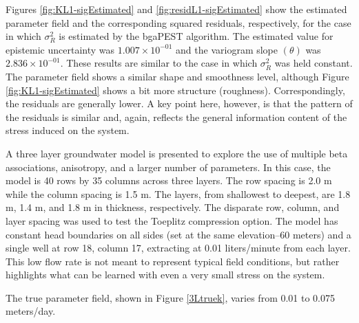 \documentclass[11pt,oneside,onecolumn]{usgsreport}
\begin{document}
\begin{appendix}
Figures \ref{fig:KL1-sigEstimated} and \ref{fig:residL1-sigEstimated}
show the estimated parameter field and the corresponding squared residuals,
respectively, for the case in which $\sigma_{R}^{2}$ is estimated
by the bgaPEST algorithm. The estimated value for epistemic uncertainty
was $1.007\times10^{-01}$ and the variogram slope $\left(\theta\right)$
was $2.836\times10^{-01}.$ These results are similar to the case
in which $\sigma_{R}^{2}$ was held constant. The parameter field
shows a similar shape and smoothness level, although Figure \ref{fig:KL1-sigEstimated}
shows a bit more structure (roughness). Correspondingly, the residuals
are generally lower. A key point here, however, is that the pattern
of the residuals is similar and, again, reflects the general information
content of the stress induced on the system.



A three layer groundwater model is presented to explore the use of
multiple beta associations, anisotropy, and a larger number of parameters.
In this case, the model is 40 rows by 35 columns across three layers.
The row spacing is 2.0 m while the column spacing is 1.5 m. The layers,
from shallowest to deepest, are 1.8 m, 1.4 m, and 1.8 m in thickness,
respectively. The disparate row, column, and layer spacing was used
to test the Toeplitz compression option. The model has constant head
boundaries on all sides (set at the same elevation--60 meters) and
a single well at row 18, column 17, extracting at 0.01 liters/minute
from each layer. This low flow rate is not meant to represent typical
field conditions, but rather highlights what can be learned with even
a very small stress on the system.

The true parameter field, shown in Figure \ref{3Ltruek}, varies from
0.01 to 0.075 meters/day. 


\end{appendix}
\end{document}
